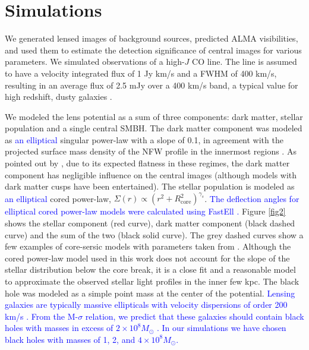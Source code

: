 \documentclass[chicago]{emulateapj}
\newcommand{\blue}{\textcolor{blue}}
\begin{document}
\section{Simulations}
We generated lensed images of background sources, predicted ALMA visibilities, and used them to estimate the detection significance of central images for various parameters. We simulated observations of a high-$J$ CO line. The line is assumed to have a velocity integrated flux of 1 Jy km/s and a FWHM of 400 km/s, resulting in an average flux of 2.5 mJy over a 400 km/s band, a typical value for high redshift, dusty galaxies \citep{Bothwell:12}. 

We modeled the lens potential as a sum of three components: dark matter, stellar population and a single central SMBH. The dark matter component was modeled as \blue{an elliptical} singular power-law with a slope of 0.1, in agreement with the projected surface mass density of the NFW profile in the innermost regions \citep{Golse:02}. As  pointed out by \citet{Keeton:03}, due to its expected flatness in these regimes, the dark matter component has negligible influence on the central images (although models with dark matter cusps have been entertained). 
The stellar population is modeled as \blue{an elliptical} cored power-law, $\Sigma(r)\propto (r^2+R_{\mathrm{core}}^2)^{\gamma_s}$. \blue{The deflection angles for elliptical cored power-law models were calculated using FastEll \citep{Barkana:98}.}  Figure \ref{fig2} shows the stellar component (red curve), dark matter component (black dashed curve) and the sum of the two (black solid curve). The grey dashed curves show a few examples of core-sersic models with parameters taken from \citet{Ferrarese:06}. Although the cored power-law model used in this work does not account for the slope of the stellar distribution below the core break, it is a close fit and a reasonable model to approximate the observed stellar light profiles in the inner few kpc. 
The black hole was modeled as a simple point mass at the center of the potential. 
\blue{Lensing galaxies are typically massive ellipticals with velocity dispersions of order 200 km/s \citep[e.g.,][]{Sonnenfeld:13}. From the M-$\sigma$ relation, we predict that these galaxies should contain black holes with masses in excess of $2\times10^8 M_{\odot}$ \citep[e.g.,][]{Kormendy:13}. In our simulations we have chosen black holes with masses of 1, 2, and $4 \times 10^8 M_{\odot}$.}
\end{document}
